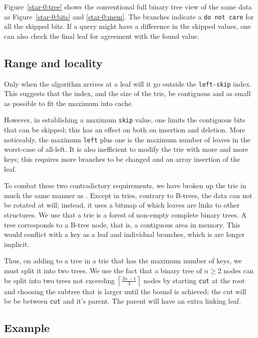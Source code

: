 \documentclass[12pt]{article}
\newcommand{\code}[1]{\colorbox{light-gray}{\texttt{#1}}}
\begin{document}
Figure~\ref{star-0:tree} shows the conventional full binary tree view of the same data as Figure~\ref{star-0:bits} and \ref{star-0:mem}. The branches indicate a \code{do not care} for all the skipped bits. If a query might have a difference in the skipped values, one can also check the final leaf for agreement with the found value.

\subsection{Range and locality}

Only when the algorithm arrives at a leaf will it go outside the \code{left-skip} index. This suggests that the index, and the size of the trie, be contiguous and as small as possible to fit the maximum into cache.

However, in establishing a maximum \code{skip} value, one limits the contiguous bits that can be skipped; this has an effect on both on insertion and deletion. More noticeably, the maximum \code{left} plus one is the maximum number of leaves in the worst-case of all-left. It is also inefficient to modify the trie with more and more keys; this requires more branches to be changed and an array insertion of the leaf.

To combat these two contradictory requirements, we have broken up the trie in much the same manner as \cite{bayer1972organization}. Except in tries, contrary to B-trees, the data can not be rotated at will; instead, it uses a bitmap of which leaves are links to other structures. We use that a trie is a forest of non-empty complete binary trees. A tree corresponds to a B-tree node\cite{knuth1997sorting}, that is, a contiguous area in memory. This would conflict with a key as a leaf and individual branches, which is are longer implicit.

Thus, on adding to a tree in a trie that has the maximum number of keys, we must split it into two trees. We use the fact that a binary tree of $n \ge 2$ nodes can be split into two trees not exceeding $\left\lceil \frac{2n-1}{3} \right\rceil$ nodes by starting \code{cut} at the root and choosing the subtree that is larger until the bound is achieved; the cut will be be between \code{cut} and it's parent. The parent will have an extra linking leaf.

\subsection{Example}
\end{document}
